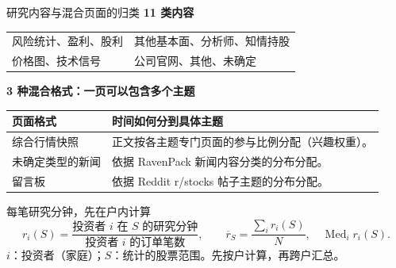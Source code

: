 \begin{frame}[label=categories]{研究内容与混合页面的归类}
  \small
  \textbf{11 类内容}\par\smallskip
  \begin{tabularx}{\linewidth}{@{}YY@{}}
    风险统计、盈利、股利 & 其他基本面、分析师、知情持股\\
    价格图、技术信号 & 公司官网、其他、未确定\\
  \end{tabularx}\par\medskip
  \textbf{3 种混合格式：一页可以包含多个主题}\par\smallskip
  \begin{tabularx}{\linewidth}{@{}L{.27\linewidth}Y@{}}
    \toprule 页面格式 & 时间如何分到具体主题\\\midrule
    综合行情快照 & 正文按各主题专门页面的参与比例分配（兴趣权重）。\\
    未确定类型的新闻 & 依据 RavenPack 新闻内容分类的分布分配。\\
    留言板 & 依据 Reddit r/stocks 帖子主题的分布分配。\\\bottomrule
  \end{tabularx}
\end{frame}

\newcommand{\depthbars}[5]{%
  \node[anchor=east] at (0,#1+.26) {#2};
  \fill[#3!38] (0,#1+.28) rectangle (#4,#1+.53);
  \fill[#3] (0,#1-.02) rectangle (#5,#1+.23);
  \node[anchor=west,text=#3] at (#4,#1+.40) {#4};
  \node[anchor=west,text=#3,font=\small\bfseries] at (#5,#1+.09) {#5};}
\begin{frame}[label=depth]{每笔研究分钟，先在户内计算}
  \[
    r_i(S)=\frac{\text{投资者 }i\text{ 在 }S\text{ 的研究分钟}}{\text{投资者 }i\text{ 的订单笔数}},
    \qquad \overline r_S=\frac{\sum_i r_i(S)}{N},\quad \operatorname{Med}_i r_i(S).
  \]
  {\small \(i\)：投资者（家庭）；\(S\)：统计的股票范围。先按户计算，再跨户汇总。}
  {\centering
  \par}
  \scriptsize{}
\end{frame}

